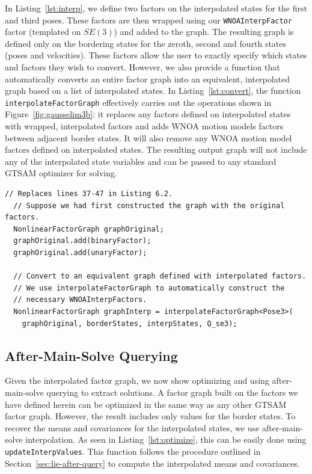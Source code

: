 In Listing~\ref{lst:interp}, we define two factors on the interpolated states for the first and third poses. These factors are then wrapped using our \texttt{WNOAInterpFactor} factor (templated on $SE(3)$) and added to the graph.
The resulting graph is defined only on the bordering states for the zeroth, second and fourth states (poses and velocities).
These factors allow the user to exactly specify which states and factors they wish to convert.
However, we also provide a function that automatically converts an entire factor graph into an equivalent, interpolated graph based on a list of interpolated states. In Listing~\ref{lst:convert}, the function \texttt{interpolateFactorGraph} effectively carries out the operations shown in Figure~\ref{fig:gausselim3b}: it replaces any factors defined on interpolated states with wrapped, interpolated factors and adds \ac{WNOA} motion models factors between adjacent border states. It will also remove any \ac{WNOA} motion model factors defined on interpolated states. The resulting output graph will not include any of the interpolated state variables and can be passed to any standard GTSAM optimizer for solving.

\begin{lstlisting}[style=C++Style, label={lst:convert}, caption={Converting to an interpolated factor graph.}, firstnumber=37]
  // Replaces lines 37-47 in Listing 6.2.
  // Suppose we had first constructed the graph with the original factors.
  NonlinearFactorGraph graphOriginal;
  graphOriginal.add(binaryFactor);
  graphOriginal.add(unaryFactor);

  // Convert to an equivalent graph defined with interpolated factors.
  // We use interpolateFactorGraph to automatically construct the
  // necessary WNOAInterpFactors.
  NonlinearFactorGraph graphInterp = interpolateFactorGraph<Pose3>(
    graphOriginal, borderStates, interpStates, Q_se3);
\end{lstlisting}


\subsection{After-Main-Solve Querying}\label{sec:post-query-implem}
Given the interpolated factor graph, we now show optimizing and using after-main-solve querying to extract solutions.
A factor graph built on the factors we have defined herein can be optimized in the same way as any other \ac{GTSAM} factor graph.
However, the result includes only values for the border states.
To recover the means and covariances for the interpolated states, we use after-main-solve interpolation.
As seen in Listing~\ref{lst:optimize}, this can be easily done using \texttt{updateInterpValues}.
This function follows the procedure outlined in Section~\ref{sec:lie-after-query} to compute the interpolated means and covariances.

